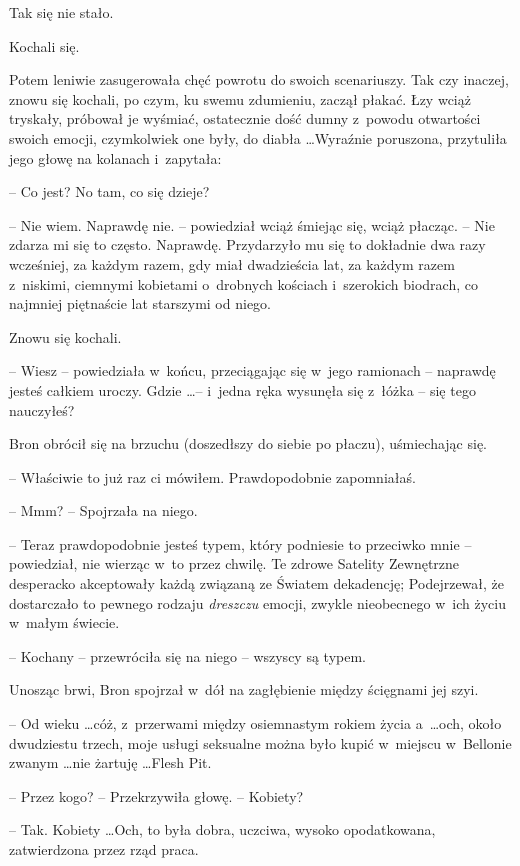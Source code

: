 \documentclass[oneside,polish,11pt,rmheadings]{mwbk}
\begin{document}
Tak się nie stało. 

Kochali się. 

Potem leniwie zasugerowała chęć powrotu do swoich scenariuszy. Tak czy inaczej, znowu się kochali, po czym, ku swemu zdumieniu, zaczął płakać. Łzy wciąż tryskały, próbował je wyśmiać, ostatecznie dość dumny z~powodu otwartości swoich emocji, czymkolwiek one były, do diabła \ldots   Wyraźnie poruszona, przytuliła jego głowę na kolanach i~zapytała:  

-- Co jest?  No tam, co się dzieje? 

-- Nie wiem. Naprawdę nie. -- powiedział wciąż śmiejąc się, wciąż płacząc. -- Nie zdarza mi się to często. Naprawdę. Przydarzyło mu się to dokładnie dwa razy wcześniej, za każdym razem, gdy miał dwadzieścia lat, za każdym razem z~niskimi, ciemnymi kobietami o~drobnych kościach i~szerokich biodrach, co najmniej piętnaście lat starszymi od niego. 

Znowu się kochali. 

-- Wiesz -- powiedziała w~końcu, przeciągając się w~jego ramionach -- naprawdę jesteś całkiem uroczy. Gdzie \ldots  -- i~jedna ręka wysunęła się z~łóżka -- się tego nauczyłeś? 

Bron obrócił się na brzuchu (doszedłszy do siebie po płaczu), uśmiechając się. 

-- Właściwie to już raz ci mówiłem. Prawdopodobnie zapomniałaś. 

-- Mmm? -- Spojrzała na niego. 

-- Teraz prawdopodobnie jesteś typem, który podniesie to przeciwko mnie -- powiedział, nie wierząc w~to przez chwilę. Te zdrowe Satelity Zewnętrzne desperacko akceptowały każdą związaną ze Światem dekadencję; Podejrzewał, że dostarczało to pewnego rodzaju \textit{dreszczu }emocji, zwykle nieobecnego w~ich życiu w~małym świecie. 

-- Kochany -- przewróciła się na niego -- wszyscy są typem. 

Unosząc brwi, Bron spojrzał w~dół na zagłębienie między ścięgnami jej szyi. 

-- Od wieku \ldots  cóż, z~przerwami między osiemnastym rokiem życia a~\ldots  och, około dwudziestu trzech, moje usługi seksualne można było kupić w~miejscu w~Bellonie zwanym \ldots  nie żartuję \ldots  Flesh Pit. 

-- Przez kogo? -- Przekrzywiła głowę. -- Kobiety? 

-- Tak. Kobiety \ldots  Och, to była dobra, uczciwa, wysoko opodatkowana, zatwierdzona przez rząd praca. 
\end{document}
